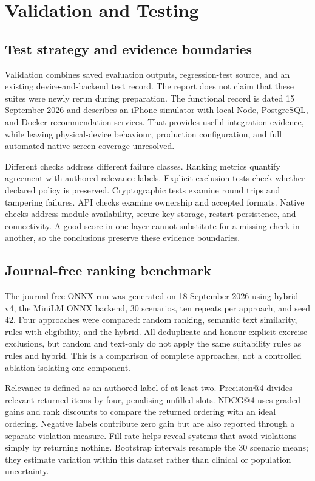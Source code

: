 \section{Validation and Testing}\label{sec:chapter-7}

\subsection{Test strategy and evidence boundaries}

Validation combines saved evaluation outputs, regression-test source, and an existing device-and-backend test record. The report does not claim that these suites were newly rerun during preparation. The functional record is dated 15 September 2026 and describes an iPhone simulator with local Node, PostgreSQL, and Docker recommendation services. That provides useful integration evidence, while leaving physical-device behaviour, production configuration, and full automated native screen coverage unresolved.

Different checks address different failure classes. Ranking metrics quantify agreement with authored relevance labels. Explicit-exclusion tests check whether declared policy is preserved. Cryptographic tests examine round trips and tampering failures. API checks examine ownership and accepted formats. Native checks address module availability, secure key storage, restart persistence, and connectivity. A good score in one layer cannot substitute for a missing check in another, so the conclusions preserve these evidence boundaries.

\subsection{Journal-free ranking benchmark}

The journal-free ONNX run was generated on 18 September 2026 using hybrid-v4, the MiniLM ONNX backend, 30 scenarios, ten repeats per approach, and seed 42. Four approaches were compared: random ranking, semantic text similarity, rules with eligibility, and the hybrid. All deduplicate and honour explicit exercise exclusions, but random and text-only do not apply the same suitability rules as rules and hybrid. This is a comparison of complete approaches, not a controlled ablation isolating one component.

Relevance is defined as an authored label of at least two. Precision@4 divides relevant returned items by four, penalising unfilled slots. NDCG@4 uses graded gains and rank discounts to compare the returned ordering with an ideal ordering. Negative labels contribute zero gain but are also reported through a separate violation measure. Fill rate helps reveal systems that avoid violations simply by returning nothing. Bootstrap intervals resample the 30 scenario means; they estimate variation within this dataset rather than clinical or population uncertainty.


